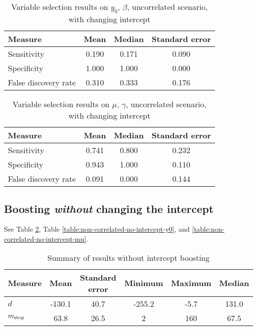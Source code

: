\begin{table}\caption{Variable selection results on $y_0$, $\beta$, uncorrelated scenario, with changing intercept}\label{table:non-correlated-with-intercept-y0}
\centering
\begin{tabular}{lccc}
\toprule
Measure &  Mean & Median & Standard error \\
\hline
Sensitivity & 0.190 &  0.171 & 0.090 \\
Specificity & 1.000 &  1.000 & 0.000 \\
False discovery rate & 0.310 &  0.333 & 0.176 \\
\bottomrule
\end{tabular}
\end{table}


\begin{table}\caption{Variable selection results on $\mu$, $\gamma$, uncorrelated scenario, with changing intercept}
\centering
\begin{tabular}{lccc}
\toprule
Measure     & Mean  & Median & Standard error     \\
\hline
Sensitivity & 0.741 &  0.800 & 0.232 \\
Specificity & 0.943 &  1.000 & 0.110 \\
False discovery rate & 0.091 &  0.000 & 0.144 \\
\bottomrule
\end{tabular}
\end{table}



\subsection{Boosting \textit{without} changing the intercept}
See Table \ref{table:non-correlated-no-intercept-summary}, Table \ref{table:non-correlated-no-intercept-y0}, and \ref{table:non-correlated-no-intercept-mu}.
\begin{table}\caption{Summary of results without intercept boosting}\label{table:non-correlated-no-intercept-summary}
\centering
\begin{tabular}{lccccc}
\toprule
Measure &    Mean &     Standard error &  Minimum & Maximum & Median \\
\hline
$d$    &   -130.1 & 40.7 &   -255.2   &   -5.7 & 131.0 \\
$m_{\text{stop}}$      &    63.8 & 26.5 &     2 &   160 & 67.5 \\
\bottomrule
\end{tabular}
\end{table}


